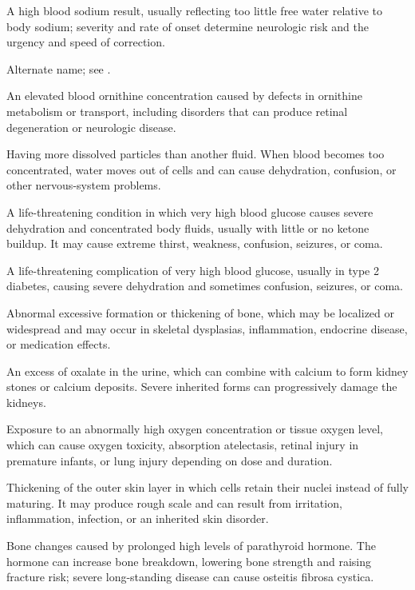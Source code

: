  A high blood sodium result, usually reflecting too little free water relative to body sodium; severity and rate of onset determine neurologic risk and the urgency and speed of correction.

 Alternate name; see .

 An elevated blood ornithine concentration caused by defects in ornithine metabolism or transport, including disorders that can produce retinal degeneration or neurologic disease.

 Having more dissolved particles than another fluid. When blood becomes too concentrated, water moves out of cells and can cause dehydration, confusion, or other nervous-system problems.

 A life-threatening condition in which very high blood glucose causes severe dehydration and concentrated body fluids, usually with little or no ketone buildup. It may cause extreme thirst, weakness, confusion, seizures, or coma.

 A life-threatening complication of very high blood glucose, usually in type 2 diabetes, causing severe dehydration and sometimes confusion, seizures, or coma.

 Abnormal excessive formation or thickening of bone, which may be localized or widespread and may occur in skeletal dysplasias, inflammation, endocrine disease, or medication effects.

 An excess of oxalate in the urine, which can combine with calcium to form kidney stones or calcium deposits. Severe inherited forms can progressively damage the kidneys.

 Exposure to an abnormally high oxygen concentration or tissue oxygen level, which can cause oxygen toxicity, absorption atelectasis, retinal injury in premature infants, or lung injury depending on dose and duration.

 Thickening of the outer skin layer in which cells retain their nuclei instead of fully maturing. It may produce rough scale and can result from irritation, inflammation, infection, or an inherited skin disorder.

 Bone changes caused by prolonged high levels of parathyroid hormone. The hormone can increase bone breakdown, lowering bone strength and raising fracture risk; severe long-standing disease can cause osteitis fibrosa cystica.

